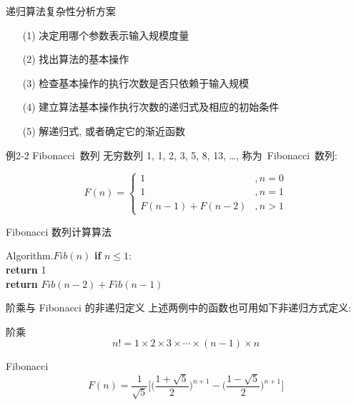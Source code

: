 \documentclass[fontset=fandol,UTF8,fleqn]{beamer}
\begin{document}
\begin{frame}{递归算法复杂性分析方案}
\begin{itemize}[<+-|alert@+>]
\item[(1)] 决定用哪个参数表示输入规模度量  
\item[(2)] 找出算法的基本操作  
\item[(3)] 检查基本操作的执行次数是否只依赖于输入规模  
\item[(4)] 建立算法基本操作执行次数的递归式及相应的初始条件   
\item[(5)] 解递归式, 或者确定它的渐近函数  
\end{itemize}
\end{frame}

\begin{frame}{例2-2 Fibonacci~数列}
  无穷数列 1, 1, 2, 3, 5, 8, 13, \ldots,  称为~Fibonacci~数列:
  \begin{exampleblock}{}
     \begin{displaymath}
   F(n)=\left\{\begin{array}{ll}
1 & ,n=0\\
1 & ,n=1\\
F(n-1)+F(n-2) & ,n>1
\end{array}\right. 
\end{displaymath}
\end{exampleblock}
\end{frame}

\begin{frame}{Fibonacci 数列计算算法}
  \begin{exampleblock}{Algorithm.$Fib(n)$}
\qquad    \textbf{if} $n \leq 1$:\\
\qquad \qquad \textbf{return} 1\\
\qquad    \textbf{return} $Fib(n-2) + Fib(n-1)$
\end{exampleblock}
\end{frame}

\begin{frame}{阶乘与 Fibonacci 的非递归定义}
  上述两例中的函数也可用如下非递归方式定义:
  \begin{exampleblock}{阶乘}
    \begin{displaymath}
  n!=1\times 2\times 3\times \cdots \times (n-1)\times n
\end{displaymath}
\end{exampleblock}
\begin{exampleblock}{ Fibonacci}
  \begin{displaymath}
  F(n)=\frac{1}{\sqrt{5}}\Bigg[\bigg(\frac{1+\sqrt{5}}{2}\bigg)^{n+1}-\bigg(\frac{1-\sqrt{5}}{2}\bigg)^{n+1}\Bigg]
\end{displaymath}
\end{exampleblock}
\end{frame}
\end{document}

